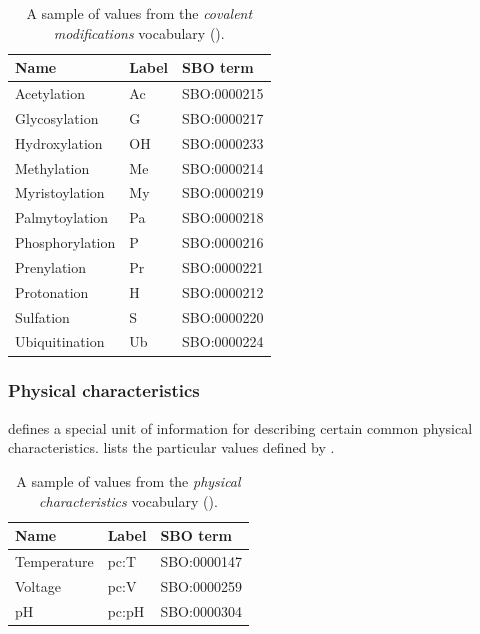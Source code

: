 \begin{table}[htb]
  \centering
  \begin{tabular}{l>{\ttfamily}l>{\ttfamily}l}
    \toprule
    \textbf{Name}   & \textbf{\rmfamily Label} & \textbf{\rmfamily SBO term} \\
    \midrule
    Acetylation     & Ac    & SBO:0000215\\
    Glycosylation   & G     & SBO:0000217\\
    Hydroxylation   & OH    & SBO:0000233\\
    Methylation     & Me    & SBO:0000214\\
    Myristoylation  & My    & SBO:0000219\\
    Palmytoylation  & Pa    & SBO:0000218\\
    Phosphorylation & P     & SBO:0000216\\
    Prenylation     & Pr    & SBO:0000221\\
    Protonation     & H     & SBO:0000212\\
    Sulfation       & S     & SBO:0000220\\
    Ubiquitination  & Ub    & SBO:0000224\\
    \bottomrule
  \end{tabular}
  \caption{A sample of values from the \emph{covalent modifications} vocabulary
    ().}
  \label{tab:covalent-mod-cv}
\end{table}


\subsubsection{Physical characteristics}
\label{sec:physical-characteristics-cv}

\SBGNPDLone defines a special unit of information for describing certain common physical characteristics.   lists the particular values defined by \SBGNPDLone. 

\begin{table}[htb]
  \centering
  \begin{tabular}{l>{\ttfamily}l>{\ttfamily}l}
    \toprule
    \textbf{Name}   & \textbf{\rmfamily Label} & \textbf{\rmfamily SBO term} \\
    \midrule
    Temperature   & pc:T  & SBO:0000147\\
    Voltage       & pc:V  & SBO:0000259\\
    pH            & pc:pH & SBO:0000304\\
    \bottomrule
  \end{tabular}
  \caption{A sample of values from the \emph{physical
      characteristics} vocabulary ().}
  \label{tab:physical-characteristics-cv}
\end{table}



